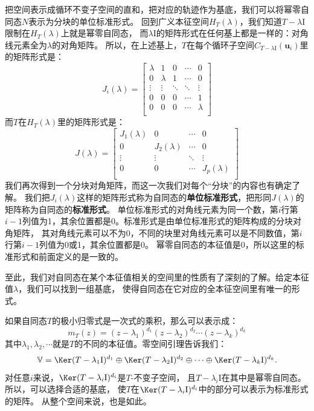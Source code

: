 \documentclass[12pt,UTF8]{ctexbook}
\begin{document}
把空间表示成循环不变子空间的直和，把对应的轨迹作为基底，我们可以将幂零自同态$N$表示为分块的单位标准形式。
回到广义本征空间$H_T(\lambda)$，我们知道$T-\lambda \mathrm{I}$限制在$H_T(\lambda)$上就是幂零自同态，
而$\lambda \mathrm{I}$的矩阵形式在任何基上都是一样的：对角线元素全为$\lambda$的对角矩阵。
所以，在上述基上，$T$在每个循环子空间$C_{T-\lambda \mathrm{I}}(\mathbf{u}_i)$里的矩阵形式是：
$$
J_i(\lambda) = \begin{bmatrix}
     \lambda & 1 & 0 & \cdots & 0 \\
     0 & \lambda & 1 & \cdots & 0 \\
     \vdots & \vdots & \ddots & \ddots & \vdots  \\
     0 & 0 & 0 & \cdots  & 1  \\
     0 & 0 & 0 & \cdots & \lambda \\
    \end{bmatrix}
$$
而$T$在$H_T(\lambda)$里的矩阵形式是：
$$
J(\lambda) = \begin{bmatrix}
     J_1(\lambda) & 0 & \cdots & 0 \\
     0 & J_2(\lambda) & \cdots & 0 \\
     \vdots & \vdots & \ddots  & \vdots  \\
     0 & 0 & \cdots  & J_p(\lambda)  \\
    \end{bmatrix}
$$
我们再次得到一个分块对角矩阵，而这一次我们对每个“分块”的内容也有确定了解。
我们把$J_i(\lambda)$这样的矩阵形式称为自同态的\textbf{单位标准形式}，把形同$J(\lambda)$的矩阵称为自同态的\textbf{标准形式}。
单位标准形式的对角线元素为同一个数，第$i$行第$i-1$列值为1，其余位置都是0。标准形式是由单位标准形式的矩阵构成的分块对角矩阵，
其对角线元素可以不为0，不同的块里对角线元素可以是不同数值，第$i$行第$i-1$列值为0或1，其余位置都是0。
幂零自同态的本征值是0，所以这里的标准形式和前面定义的是一致的。

至此，我们对自同态在某个本征值相关的空间里的性质有了深刻的了解。给定本征值$\lambda$，我们可以找到一组基底，
使得自同态在它对应的全本征空间里有唯一的形式。

如果自同态$T$的极小归零式是一次式的乘积，那么可以表示成：
$$ m_T(z) = (z - \lambda_1)^{d_1} (z - \lambda_2)^{d_2} \cdots  (z - \lambda_k)^{d_k}$$
其中$\lambda_1, \lambda_2,\cdots$就是$T$的不同的本征值。零空间引理告诉我们：
$$ \mathbb{V} = \Ker (T - \lambda_1\mathrm{I})^{d_1} \oplus \Ker (T - \lambda_2\mathrm{I})^{d_2} \oplus \cdots \oplus \Ker (T - \lambda_k\mathrm{I})^{d_k}.$$
对任意$i$来说，$\Ker (T - \lambda_i\mathrm{I})^{d_i}$是$T$-不变子空间，
且$T - \lambda_i\mathrm{I}$在其中是幂零自同态。所以，可以选择合适的基底，
使$T$在$\Ker (T - \lambda_i\mathrm{I})^{d_i}$中的部分可以表示为标准形式的矩阵。
从整个空间来说，也是如此。
\end{document}
